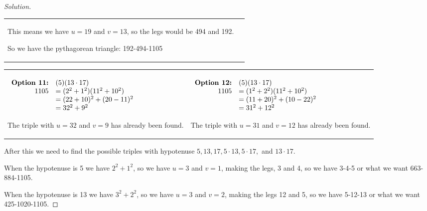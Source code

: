 \documentclass[11pt]{article}
\newenvironment{solution}
  {\renewcommand\qedsymbol{$~$}\begin{proof}[Solution]$ $\par\nobreak\ignorespaces}
  {\end{proof}}
\begin{document}
\begin{solution}
\begin{center}
\begin{NiceTabular}[width=0.95\textwidth]{X[l] !{\qquad} X[l]}
      This means we have $u=19$ and $v=13$, so the legs would be 494 and 192.

      So we have the pythagorean triangle:
      192-494-1105
      \\
    \end{NiceTabular}
  \end{center}

  \begin{center}
    \begin{NiceTabular}[width=0.95\textwidth]{X[l] !{\qquad} X[l]}
      \begin{math}
        \begin{array}[t]{rl}
          \textbf{Option 11:} & (5)(13\cdot 17)         \\
          1105                & =  (2^2+1^2)(11^2+10^2) \\
                              & = (22+10)^2 + (20-11)^2 \\
                              & = 32^2 + 9^2
        \end{array}
      \end{math}

      The triple with $u=32$ and $v=9$ has already been found.


       &
      \begin{math}
        \begin{array}[t]{rl}
          \textbf{Option 12:} & (5)(13\cdot 17)         \\
          1105                & =  (1^2+2^2)(11^2+10^2) \\
                              & = (11+20)^2 + (10-22)^2 \\
                              & = 31^2 + 12^2           \\
        \end{array}
      \end{math}

      The triple with $u=31$ and $v=12$ has already been found.
      \\
    \end{NiceTabular}
  \end{center}
  After this we need to find the possible triples with hypotenuse $5,13,17,5\cdot 13,5\cdot 17,$ and $13\cdot 17$.

  When the hypotenuse is 5 we have $2^2+1^2$, so we have $u=3$ and $v=1$, making the legs, 3 and 4, so we have 3-4-5 or what we want 663-884-1105.

  When the hypotenuse is 13 we have $3^2+2^2$, so we have $u=3$ and $v=2$, making the legs 12 and 5, so we have 5-12-13 or what we want 425-1020-1105.


\end{solution}
\end{document}
